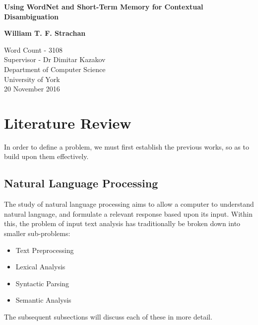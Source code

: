 \documentclass[]{article}
\begin{document}
\begin{titlepage}
    \begin{center}
        \vspace*{1cm}
        
        \Huge
        \textbf{Using WordNet and Short-Term Memory for Contextual Disambiguation}
        \vspace{2cm}
        
        \Large
        \textbf{William T. F. Strachan}
        
        \vfill
                
        \vspace{0.8cm}
        
        \Large
        Word Count - 3108\\
        Supervisor - Dr Dimitar Kazakov\\
        Department of Computer Science\\
        University of York\\
        20 November 2016
        
    \end{center}
\end{titlepage}

\tableofcontents

\newpage

\section{Literature Review}
\label{sec:LitReview}
In order to define a problem, we must first establish the previous works, so as to build upon them effectively. 
		

\subsection{Natural Language Processing}
\label{sec:NLP}
The study of natural language processing aims to allow a computer to understand natural language, and formulate a relevant response based upon its input. Within this, the problem of input text analysis has traditionally be broken down into smaller sub-problems\cite{NLPHandbook}:
\begin{itemize}
	\item Text Preprocessing
	\item Lexical Analysis
	\item Syntactic Parsing
	\item Semantic Analysis
\end{itemize}
The subsequent subsections will discuss each of these in more detail.
\end{document}
